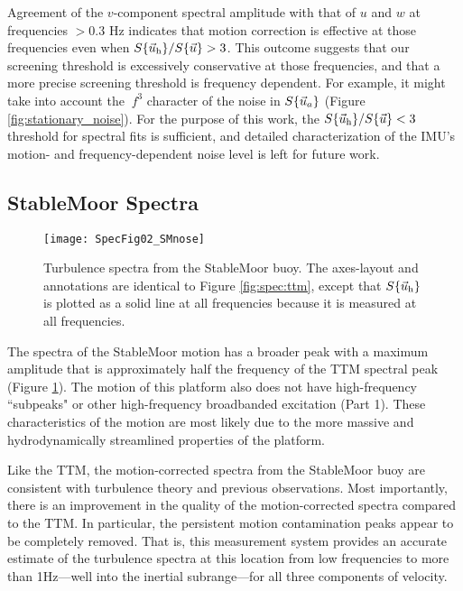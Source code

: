 Agreement of the $v$-component spectral amplitude with that of $u$ and $w$ at frequencies $>0.3$ Hz indicates that motion correction is effective at those frequencies even when $S\{\vec{u}_\mathrm{h}\}/S\{\vec{u}\} > 3$. This outcome suggests that our screening threshold is excessively conservative at those frequencies, and that a more precise screening threshold is frequency dependent. For example, it might take into account the $~f^3$ character of the noise in $S\{\vec{u}_a\}$ (Figure \ref{fig:stationary_noise}). For the purpose of this work, the $S\{\vec{u}_\mathrm{h}\}/S\{\vec{u}\} < 3$ threshold for spectral fits is sufficient, and detailed characterization of the IMU's motion- and frequency-dependent noise level is left for future work.

\subsection{StableMoor Spectra}

\begin{figure*}[th]
  \centering
  \texttt{[image: SpecFig02\_SMnose]}
  \caption{Turbulence spectra from the StableMoor buoy. The axes-layout and annotations are identical to Figure \ref{fig:spec:ttm}, except that $S\{\vec{u}_\mathrm{h}\}$ is plotted as a solid line at all frequencies because it is measured at all frequencies. }
  \label{fig:spec:sm}
\end{figure*}

The spectra of the StableMoor motion has a broader peak with a maximum amplitude that is approximately half the frequency of the TTM spectral peak (Figure \ref{fig:spec:sm}). The motion of this platform also does not have high-frequency ``subpeaks" or other high-frequency broadbanded excitation (Part 1).  These characteristics of the motion are most likely due to the more massive and hydrodynamically streamlined properties of the platform. 

Like the TTM, the motion-corrected spectra from the StableMoor buoy are consistent with turbulence theory and previous observations. Most importantly, there is an improvement in the quality of the motion-corrected spectra compared to the TTM. In particular, the persistent motion contamination peaks appear to be completely removed. That is, this measurement system provides an accurate estimate of the turbulence spectra at this location from low frequencies to more than 1Hz---well into the inertial subrange---for all three components of velocity.

